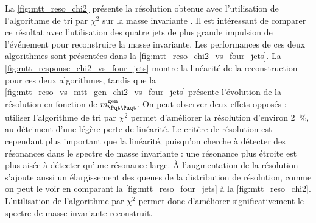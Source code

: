 \bigskip

La \cref{fig:mtt_reso_chi2} présente la résolution obtenue avec l'utilisation de l'algorithme de tri par $\chi^2$ sur la masse invariante \mtt. Il est intéressant de comparer ce résultat avec l'utilisation des quatre jets de plus grande impulsion de l'événement pour reconstruire la masse invariante. Les performances de ces deux algorithmes sont présentées dans la \cref{fig:mtt_reso_chi2_vs_four_jets}. La \cref{fig:mtt_response_chi2_vs_four_jets} montre la linéarité de la reconstruction pour ces deux algorithmes, tandis que la \cref{fig:mtt_reso_vs_mtt_gen_chi2_vs_four_jets} présente l'évolution de la résolution en fonction de $\mtt^\text{gen}$. On peut observer deux effets opposés : utiliser l'algorithme de tri par $\chi^2$ permet d'améliorer la résolution d'environ \SI{2}{\%}, au détriment d'une légère perte de linéarité. Le critère de résolution est cependant plus important que la linéarité, puisqu'on cherche à détecter des résonances dans le spectre de masse invariante : une résonance plus étroite est plus aisée à détecter qu'une résonance large. À l'augmentation de la résolution s'ajoute aussi un élargissement des queues de la distribution de résolution, comme on peut le voir en comparant la \cref{fig:mtt_reso_four_jets} à la \cref{fig:mtt_reso_chi2}. L'utilisation de l'algorithme par $\chi^2$ permet donc d'améliorer significativement le spectre de masse invariante reconstruit.


